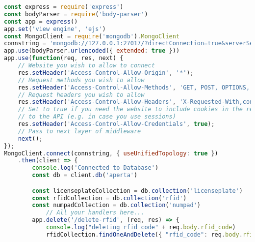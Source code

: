 \begin{lstlisting}[language=JavaScript, caption=Server code, label=lst:impl:server]
const express = require('express')
const bodyParser = require('body-parser')
const app = express()
app.set('view engine', 'ejs')
const MongoClient = require('mongodb').MongoClient
connstring = 'mongodb://127.0.0.1:27017/?directConnection=true&serverSelectionTimeoutMS=2000&appName=mongosh+1.2.3'
app.use(bodyParser.urlencoded({ extended: true }))
app.use(function(req, res, next) {
    // Website you wish to allow to connect
    res.setHeader('Access-Control-Allow-Origin', '*');
    // Request methods you wish to allow
    res.setHeader('Access-Control-Allow-Methods', 'GET, POST, OPTIONS, PUT, PATCH, DELETE');
    // Request headers you wish to allow
    res.setHeader('Access-Control-Allow-Headers', 'X-Requested-With,content-type');
    // Set to true if you need the website to include cookies in the requests sent
    // to the API (e.g. in case you use sessions)
    res.setHeader('Access-Control-Allow-Credentials', true);
    // Pass to next layer of middleware
    next();
});
MongoClient.connect(connstring, { useUnifiedTopology: true })
    .then(client => {
        console.log('Connected to Database')
        const db = client.db('aperta')

        const licenseplateCollection = db.collection('licenseplate')
        const rfidCollection = db.collection('rfid')
        const numpadCollection = db.collection('numpad')
            // All your handlers here...
        app.delete('/delete-rfid', (req, res) => {
            console.log("deleting rfid code" + req.body.rfid_code)
            rfidCollection.findOneAndDelete({ "rfid_code": req.body.rfid_code }).then(result => { res.sendStatus(200) })


\end{lstlisting}
